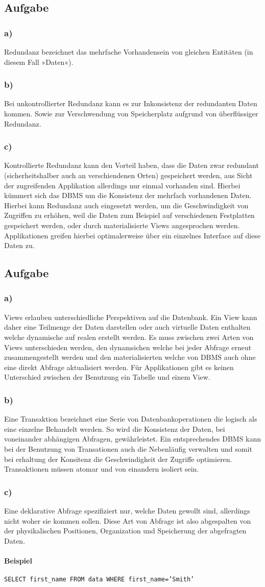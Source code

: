 \documentclass[12pt,a4paper,DIV=9]{scrartcl}
\newcounter{temp}
\newcommand{\aufgabe}[1]{
  \setcounter{temp}{\value{subsection}}
  \setcounter{subsection}{#1}
  \addtocounter{subsection}{-1}
  \subsection{Aufgabe}
  \setcounter{subsection}{\value{temp}}
}
\newcommand{\teil}[2][]{
  \subsubsection*{#2) #1}
}
\begin{document}
\aufgabe{3}
\teil{a}
  Redundanz bezeichnet das mehrfache Vorhandensein von gleichen Entitäten (in diesem Fall »Daten«).
\teil{b}
  Bei unkontrollierter Redundanz kann es zur Inkonsistenz der redundanten Daten kommen. Sowie zur Verschwendung von Speicherplatz aufgrund von überflüssiger Redundanz.

\teil{c}
  Kontrollierte Redundanz kann den Vorteil haben, dass die Daten zwar redundant (sicherheitshalber auch an verschiendenen Orten) gespeichert werden, aus Sicht der zugreifenden Applikation allerdings nur einmal vorhanden sind. Hierbei kümmert sich das DBMS um die Konsistenz der mehrfach vorhandenen Daten. 
  Hierbei kann Redundanz auch eingesetzt werden, um die Geschwindigkeit von Zugriffen zu erhöhen, weil die Daten zum Beispiel auf verschiedenen Festplatten gespeichert werden, oder durch materialisierte Views angesprochen werden.
  Applikationen greifen hierbei optimalerweise über ein einzelnes Interface auf diese Daten zu.

\aufgabe{4}
\teil{a}
  Views erlauben unterschiedliche Perspektiven auf die Datenbank. Ein View kann daher eine Teilmenge  der Daten darstellen oder auch virtuelle Daten enthalten welche dynamische auf realen erstellt werden. Es muss zwischen zwei Arten von Views unterschieden werden, den dynamsichen welche bei jeder Abfrage erneut zusammengestellt werden und den materialisierten welche von DBMS auch ohne eine direkt Abfrage aktualisiert werden. Für Applikationen gibt es keinen Unterschied zwischen der Benutzung ein Tabelle und einem View. 

\teil{b}
  Eine Transaktion bezeichnet eine Serie von Datenbankoperationen die logisch als eine einzelne Behandelt werden. So wird die Konsistenz der Daten, bei voneinander abhängigen Abfragen, gewährleistet. Ein entsprechendes DBMS kann bei der Benutzung von Transationen auch die Nebenläufig verwalten und somit bei erhaltung der Konsitenz die Geschwindigkeit der Zugriffe optimieren. Transaktionen müssen atomar und von einandern isoliert sein.

\teil{c}
  Eine deklarative Abfrage spezifiziert nur, welche Daten gewollt sind, allerdings nicht woher sie kommen sollen. Diese Art von Abfrage ist also abgespalten von der physikalischen Positionen, Organization und Speicherung der abgefragten Daten.

\paragraph{Beispiel} \texttt{SELECT first\_name FROM data WHERE first\_name='Smith'}
\end{document}
